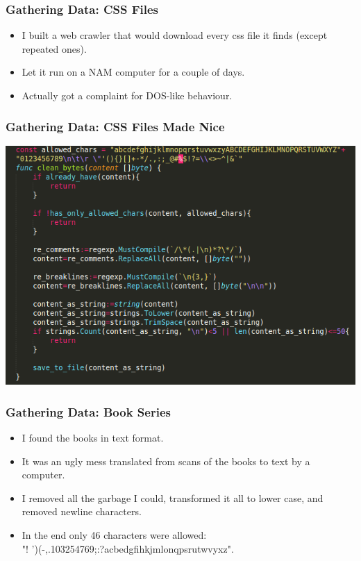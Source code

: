 \documentclass[12]{beamer}
\begin{document}
\begin{frame}
\frametitle{Gathering Data: CSS Files}
\begin{itemize}
\item<1-> I built a web crawler that would download every css file it finds (except repeated ones).
\item<1-> Let it run on a NAM computer for a couple of days.
\item<1-> Actually got a complaint for DOS-like behaviour.
\end{itemize}
\end{frame}

\begin{frame}
\frametitle{Gathering Data: CSS Files Made Nice}
\begin{center}
\includegraphics[scale=0.4]{../images/css_filter.png}
\end{center}
\end{frame}

\begin{frame}
\frametitle{Gathering Data: Book Series}
\begin{itemize}
\item<1-> I found the books in text format.
\item<1-> It was an ugly mess translated from scans of the books to text by a computer.
\item<1-> I removed all the garbage I could, transformed it all to lower case, and removed newline characters.
\item<1-> In the end only 46 characters were allowed: \\"! ')(-,.103254769;:?acbedgfihkjmlonqpsrutwvyxz".
\end{itemize}
\end{frame}
\end{document}

